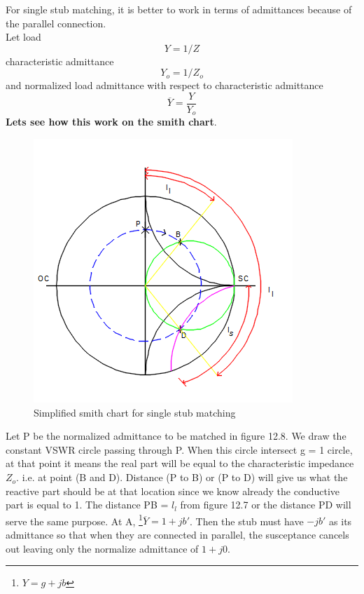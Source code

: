 For single stub matching, it is better to work in terms of admittances because of the parallel connection.\\
Let load 
\begin{equation}
Y = 1/Z
\end{equation}
characteristic admittance 
\begin{equation} Y_o = 1/Z_o\end{equation} 
and normalized load admittance with respect to characteristic admittance 
\begin{equation} 
\overline{Y}=\frac{Y}{Y_o} 
\end{equation}
\textbf{Lets see how this work on the smith chart}. %
\begin{figure}[h]
\centering
\includegraphics[width=1\linewidth]{./graphics/qwtch}
\caption{Simplified smith chart for single stub matching}
\end{figure}
Let P be the normalized admittance to be matched in figure 12.8. We draw the constant VSWR circle passing through P. When this circle intersect g = 1 circle, at that point it means the real part will be equal to the characteristic impedance $Z_o$. i.e. at point (B and D). Distance (P to B) or (P to D) will give us what the reactive
part should be at that location since we know already the conductive part is equal to 1. The distance PB = $l_l$ from figure 12.7 or the distance PD will serve the same purpose. At A, \footnote{$Y = g + jb$}$\overline{Y} = 1 + jb' $. Then the stub must have $-jb'$ as its admittance so that when they are connected in parallel, the susceptance cancels out leaving only the normalize admittance of $1 + j0$.
